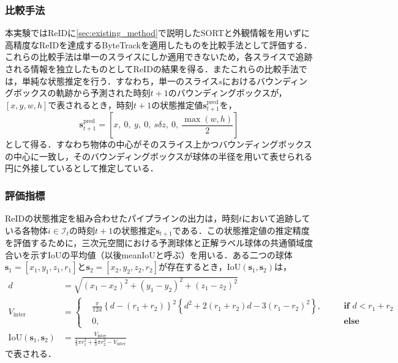         \subsubsection{比較手法}
        本実験ではReIDに\ref{sec:existing_method}で説明したSORTと外観情報を用いずに高精度なReIDを達成するByteTrack\cite{zhang2022bytetrack}を適用したものを比較手法として評価する．これらの比較手法は単一のスライスにしか適用できないため，各スライスで追跡される情報を独立したものとしてReIDの結果を得る．またこれらの比較手法では，単純な状態推定を行う．すなわち，単一のスライス$s$におけるバウンディングボックスの軌跡から予測された時刻$t + 1$のバウンディングボックスが，$[x, y, w, h]$で表されるとき，時刻$t+1$の状態推定値$\bm{s}_{t+1}^{\text{pred}}$を，
        \begin{equation}
            \label{eq:naive_state_estimation}
            \bm{s}^{\text{pred}}_{t+1} = \left[x,~ 0,~ y,~ 0,~ s \delta z,~ 0,~ \frac{\max(w, h)}{2}\right]
        \end{equation}
        として得る．すなわち物体の中心がそのスライス上かつバウンディングボックスの中心に一致し，そのバウンディングボックスが球体の半径を用いて表せられる円に外接しているとして推定している．
        
        \subsubsection{評価指標}
        
        ReIDの状態推定を組み合わせたパイプラインの出力は，時刻$t$において追跡している各物体$i \in \mathcal{I}_t$の時刻$t+1$の状態推定$\bm{s}_{t+1}$である．この状態推定値の推定精度を評価するために，三次元空間における予測球体と正解ラベル球体の共通領域度合いを示すIoUの平均値（以後meanIoUと呼ぶ）を用いる．ある二つの球体$\bm{s}_1 = [x_1, y_1, z_1, r_1]$と$\bm{s}_2 = [x_2, y_2, z_2, r_2]$が存在するとき，IoU$(\bm{s}_1, \bm{s}_2)$は，
        \begin{equation}
            \label{eq:sphere_iou}
            \begin{aligned}
                d &= \sqrt{(x_1 - x_2)^2 + (y_1 - y_2)^2 + (z_1 - z_2)^2}
                \\V_{\text{inter}} &= \left\{
                    \begin{aligned}
                        &\frac{\pi}{12 d} \left\{d - (r_1 + r_2)\right\}^2 \left\{d^2 + 2(r_1 + r_2)d - 3 (r_1 - r_2)^2\right\},& \quad &\textbf{if } d < r_1 + r_2
                        \\ & 0,& &\textbf{else} 
                    \end{aligned}
                \right.
                \\\text{IoU}(\bm{s}_1, \bm{s}_2) &= \frac{V_{\text{inter}}}{\frac{4}{3}\pi r_1^2 + \frac{4}{3}\pi r_2^2 - V_{\text{inter}}}
            \end{aligned}
        \end{equation}
        で表される．

